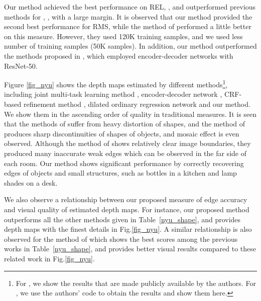 \documentclass[10pt,twocolumn,letterpaper]{article}
\begin{document}
Our method achieved the best performance on REL, , and outperformed previous methods for
, ,   with a large margin.
It is observed that our method provided the second best performance for RMS, while the method of \cite{fu2018deep} performed a little better on this measure. However, they used 120K training samples, and we used less number of training samples (50K samples).
In addition, our method outperformed the methods proposed in \cite{laina2016deeper,ma2017sparse}, which employed encoder-decoder networks with ResNet-50. 

Figure \ref{fig_nyu} shows the depth maps estimated by different methods\footnote{For \cite{Eigen2015PredictingDS}, we show the results that are made publicly available by the authors. For \cite{laina2016deeper,Xu2017MultiscaleCC,fu2018deep}, we use the authors' code to obtain the results and show them here. }, including joint multi-task learning method \cite{Eigen2015PredictingDS}, encoder-decoder network \cite{laina2016deeper}, CRF-based refinement method \cite{Xu2017MultiscaleCC}, dilated ordinary regression network \cite{fu2018deep} and our method.
We show them in the ascending order of quality in traditional measures.
It is seen that the methods of \cite{laina2016deeper,Xu2017MultiscaleCC} suffer from heavy distortion of shapes, and the method of \cite{fu2018deep} produces sharp discontinuities of shapes of objects, and mosaic effect is even observed.
Although the method of \cite{Eigen2015PredictingDS} shows relatively clear image boundaries, they produced many inaccurate weak edges which can be observed in the far side of each room. 
Our method shows significant performance by correctly recovering edges of objects  and small structures, such as bottles in a kitchen and lamp shades on a desk.

We also observe a relationship between our proposed measure of edge accuracy   and visual quality of estimated depth maps. For instance, our proposed method outperforms all the other methods given in Table~\ref{nyu_shape}, and provides depth maps with the finest details in Fig.\ref{fig_nyu}. A similar relationship is also observed for the method of \cite{Eigen2015PredictingDS} which shows the best scores among the previous works in Table~\ref{nyu_shape}, and provides better visual results compared to these related work in Fig.\ref{fig_nyu}.   
\end{document}
